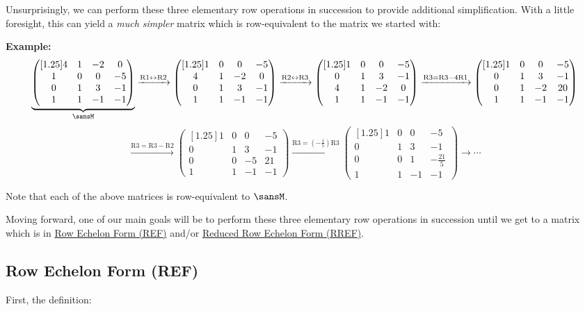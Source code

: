 \documentclass[12 pt]{article}
\newcommand{\pmat}[1]{\begin{pmatrix}[1.25]#1\end{pmatrix}}
\begin{document}
\noindent Unsurprisingly, we can perform these three elementary row operations in succession to provide additional simplification. With a little foresight, this can yield a \textit{much simpler} matrix which is row-equivalent to the matrix we started with: \vspace{3mm}

\noindent\textbf{Example:}
\[
	\underbrace{\pmat{4 & 1 & -2 & 0 \\ 1 & 0 & 0 & -5 \\ 0 & 1 & 3 & -1 \\ 1 & 1 & -1 & -1}}_{\sansM}
	\xrightarrow{\text{R1}\leftrightarrow\text{R2}}
	\pmat{1 & 0 & 0 & -5 \\ 4 & 1 & -2 & 0 \\ 0 & 1 & 3 & -1 \\ 1 & 1 & -1 & -1}
	\xrightarrow{\text{R2}\leftrightarrow\text{R3}}
	\pmat{1 & 0 & 0 & -5 \\ 0 & 1 & 3 & -1 \\ 4 & 1 & -2 & 0 \\ 1 & 1 & -1 & -1}
	\xrightarrow{\text{R3}=\text{R3}-4\text{R1}}
	\pmat{1 & 0 & 0 & -5 \\ 0 & 1 & 3 & -1 \\ 0 & 1 & -2 & 20 \\ 1 & 1 & -1 & -1}
\]
\[
	\xrightarrow{\text{R3}=\text{R3}-\text{R2}}
	\pmat{1 & 0 & 0 & -5 \\ 0 & 1 & 3 & -1 \\ 0 & 0 & -5 & 21 \\ 1 & 1 & -1 & -1}
	\xrightarrow{\text{R3}=(-\frac{1}{5})\text{R3}}
	\pmat{1 & 0 & 0 & -5 \\ 0 & 1 & 3 & -1 \\ 0 & 0 & 1 & -\frac{21}{5} \\ 1 & 1 & -1 & -1}
	\longrightarrow\cdots
\]

\noindent Note that each of the above matrices is row-equivalent to $\sansM$.\vspace{3mm}

Moving forward, one of our main goals will be to perform these three elementary row operations in succession until we get to a matrix which is in \ul{Row Echelon Form (REF)} and/or \ul{Reduced Row Echelon Form (RREF)}.

\newpage

\subsection*{Row Echelon Form (REF)}
First, the definition:\vspace{3mm}
\end{document}
